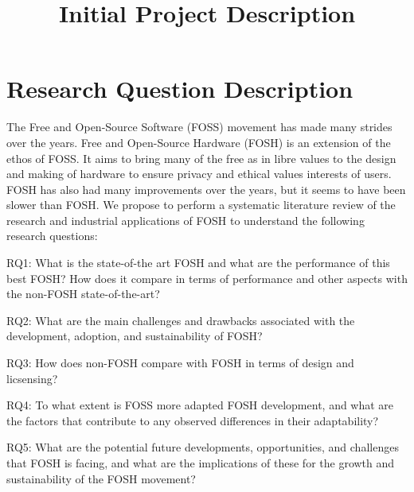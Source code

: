 \documentclass[conference]{IEEEtran}
\begin{document}
\title{Initial Project Description}

\author{
}

\maketitle

\section{Research Question Description}
The Free and Open-Source Software (FOSS) movement has made many strides over the years. Free and Open-Source Hardware (FOSH) is an extension of the ethos of FOSS. It aims to bring many of the free as in libre values to the design and making of hardware to ensure privacy and ethical values interests of users. FOSH has also had many improvements over the years, but it seems to have been slower than FOSH.
We propose to perform a systematic literature review of the research and industrial applications of FOSH to understand the following research questions:

RQ1: What is the state-of-the art FOSH and what are the performance of this best FOSH? How does it compare in terms of performance and other aspects with the non-FOSH state-of-the-art? 

RQ2: What are the main challenges and drawbacks associated with the development, adoption, and sustainability of FOSH?

RQ3: How does non-FOSH compare with FOSH in terms of design and licsensing?

RQ4: To what extent is FOSS more adapted FOSH development, and what are the factors that contribute to any observed differences in their adaptability?

RQ5: What are the potential future developments, opportunities, and challenges that FOSH is facing, and what are the implications of these for the growth and sustainability of the FOSH movement?
\end{document}
